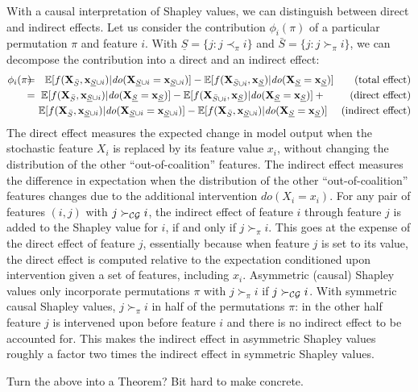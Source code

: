 \documentclass{article}
\newcommand{\vX}{\mathbf{X}}
\newcommand{\vx}{\mathbf{x}}
\newcommand{\expectation}{\mathbb{E}}
\newcommand{\contribution}{{\phi}}
\newcommand{\val}{{v}}
\newcommand{\dodo}{\mathit{do}}
\newcommand{\ldo}[1]{\dodo(X_{#1} = x_{#1})}
\newcommand{\lvdo}[1]{\dodo(\vX_{#1} = \vx_{#1})}
\newcommand{\perm}{\pi}
\newcommand{\isequal}{\hspace*{-2.5mm} & = & \hspace*{-2.5mm}}
\newcommand{\Spre}{\underline{S}}
\newcommand{\Spost}{\bar{S}}
\newcommand{\comment}[1]{{\color{red} #1}}
\begin{document}
With a causal interpretation of Shapley values, we can distinguish between direct and indirect effects. Let us consider the contribution $\contribution_i(\perm)$ of a particular permutation $\perm$ and feature $i$. With $\Spre = \{j: j \prec_\perm i\}$ and $\Spost = \{j: j \succ_\perm i\}$, we can decompose the contribution into a direct and an indirect effect:
\begin{eqnarray*}
\contribution_i(\perm) \isequal
\expectation[f(\vX_{\Spost},\vx_{\Spre \cup i})|\lvdo{\Spre \cup i}] - \expectation[f(\vX_{\Spost \cup i},\vx_{\Spre})|\lvdo{\Spre}] ~~~~~~\mbox{(total effect)} \\
\isequal \expectation[f(\vX_{\Spost},\vx_{\Spre \cup i})|\lvdo{\Spre}] - \expectation[f(\vX_{\Spost \cup i},\vx_{\Spre})|\lvdo{\Spre}] + ~~~~~~~\mbox{(direct effect)} \\
&& \! \! \! \! \expectation[f(\vX_{\Spost},\vx_{\Spre \cup i})|\lvdo{\Spre \cup i}] - \expectation[f(\vX_{\Spost},\vx_{\Spre \cup i})|\lvdo{\Spre}] ~~~~\mbox{(indirect effect)}
\end{eqnarray*}
The direct effect measures the expected change in model output when the stochastic feature $X_i$ is replaced by its feature value $x_i$, without changing the distribution of the other ``out-of-coalition'' features. The indirect effect measures the difference in expectation when the distribution of the other ``out-of-coalition'' features changes due to the additional intervention $\ldo{i}$. For any pair of features $(i,j)$ with $j \succ_{\cal CG} i$, the indirect effect of feature $i$ through feature $j$ is added to the Shapley value for $i$, if and only if $j \succ_\perm i$. This goes at the expense of the direct effect of feature $j$, essentially because when feature $j$ is set to its value, the direct effect is computed relative to the expectation conditioned upon intervention given a set of features, including $x_i$. Asymmetric (causal) Shapley values only incorporate permutations $\perm$ with $j \succ_\perm i$ if $j \succ_{\cal CG} i$. With symmetric causal Shapley values, $j \succ_\perm i$ in half of the permutations $\perm$: in the other half feature $j$ is intervened upon before feature $i$ and there is no indirect effect to be accounted for. This makes the indirect effect in asymmetric Shapley values roughly a factor two times the indirect effect in symmetric Shapley values.


\comment{Turn the above into a Theorem? Bit hard to make concrete.}
\end{document}
